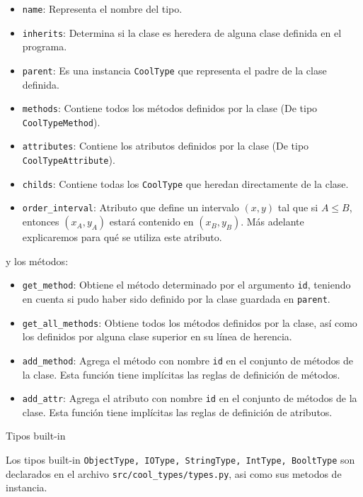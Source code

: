 \documentclass[a4paper,10pt,twocolumn]{article}
\begin{document}
\begin{itemize}
	\item \lstinline|name|: Representa el nombre del tipo. 
	\item \lstinline|inherits|: Determina si la clase es heredera de alguna clase definida en el programa. 
	\item \lstinline|parent|: Es una instancia \lstinline|CoolType| que representa el padre de la clase definida. 
	\item \lstinline|methods|: Contiene todos los métodos definidos por la clase (De tipo \lstinline|CoolTypeMethod|). 
	\item \lstinline|attributes|: Contiene los atributos definidos por la clase (De tipo \lstinline|CoolTypeAttribute|).
	\item \lstinline|childs|: Contiene todas los \lstinline|CoolType| que heredan directamente de la clase. 
	\item \lstinline|order_interval|: Atributo que define un intervalo $(x, y)$ tal que si $A\leq B$, entonces $(x_A, y_A)$ estará contenido en $(x_B, y_B)$. Más adelante explicaremos para qué se utiliza este atributo. 
\end{itemize}

y los métodos: 

\begin{itemize}
	\item \lstinline|get_method|: Obtiene el método determinado por el argumento \lstinline|id|, teniendo en cuenta si pudo haber sido definido por la clase guardada en \lstinline|parent|. 
	\item \lstinline|get_all_methods|: Obtiene todos los métodos definidos por la clase, así como los definidos por alguna clase superior en su línea de herencia. 
	\item \lstinline|add_method|: Agrega el método con nombre \lstinline|id| en el conjunto de métodos de la clase. Esta función tiene implícitas las reglas de definición de métodos. 
	\item \lstinline|add_attr|: Agrega el atributo con nombre \lstinline|id| en el conjunto de métodos de la clase. Esta función tiene implícitas las reglas de definición de atributos. 
\end{itemize}

Tipos built-in

Los tipos built-in \lstinline|ObjectType, IOType, StringType, IntType, BooltType| son declarados en el archivo \lstinline|src/cool_types/types.py|, asi como sus metodos de instancia.
\end{document}
